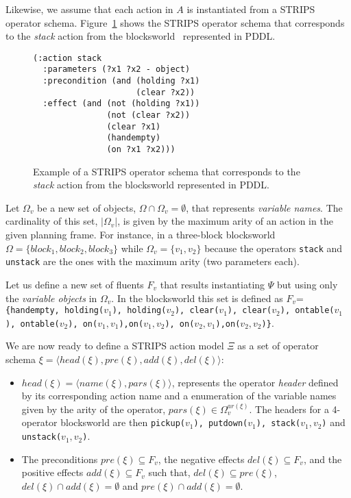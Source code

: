 \documentclass[letterpaper]{article} %
\newcommand{\tup}[1]{{\langle #1 \rangle}}
\begin{document}
Likewise, we assume that each action in $A$ is instantiated from a STRIPS operator schema. Figure~\ref{fig:stack} shows the STRIPS operator schema that corresponds to the {\em stack} action from the blocksworld~\cite{slaney2001blocks} represented in PDDL.
\begin{figure}[hbt]
\begin{footnotesize}
\begin{verbatim}
(:action stack
  :parameters (?x1 ?x2 - object)
  :precondition (and (holding ?x1) 
                     (clear ?x2))
  :effect (and (not (holding ?x1)) 
               (not (clear ?x2))
               (clear ?x1) 
               (handempty) 
               (on ?x1 ?x2)))
\end{verbatim}
\end{footnotesize}
 \caption{\small Example of a STRIPS operator schema that corresponds to the {\em stack} action from the blocksworld represented in PDDL.}
\label{fig:stack}
\end{figure}

Let $\Omega_v$ be a new set of objects, $\Omega\cap\Omega_v=\emptyset$, that represents {\em variable names}. The cardinality of this set, $|\Omega_v|$, is given by the maximum arity of an action in the given planning frame. For instance, in a three-block blocksworld $\Omega=\{block_1, block_2, block_3\}$ while $\Omega_v=\{v_1, v_2\}$ because the operators {\small\tt stack} and {\small\tt unstack} are the ones with the maximum arity (two parameters each). 

Let us define a new set of fluents $F_{v}$ that results instantiating $\Psi$ but using only the {\em variable objects} in $\Omega_v$. In the blocksworld this set is defined as $F_v$={\small\tt\{handempty, holding($v_1$), holding($v_2$), clear($v_1$), clear($v_2$), ontable($v_1$), ontable($v_2$), on($v_1,v_1$),on($v_1,v_2$), on($v_2,v_1$),on($v_2,v_2$)\}}.

We are now ready to define a STRIPS action model $\Xi$ as a set of operator schema $\xi=\tup{head(\xi),pre(\xi),add(\xi),del(\xi)}$:
\begin{itemize}
\item $head(\xi)=\tup{name(\xi),pars(\xi)}$, represents the operator {\em header} defined by its corresponding action name and a enumeration of the variable names given by the arity of the operator, $pars(\xi)\in\Omega_v^{ar(\xi)}$. The headers for a 4-operator blocksworld are then {\small\tt pickup($v_1$), putdown($v_1$), stack($v_1,v_2$)} and {\small\tt unstack($v_1,v_2$)}.
\item The preconditions $pre(\xi)\subseteq F_v$, the negative effects $del(\xi)\subseteq F_v$, and the positive effects $add(\xi)\subseteq F_v$ such that, $del(\xi)\subseteq pre(\xi)$, $del(\xi)\cap add(\xi)=\emptyset$ and $pre(\xi)\cap add(\xi)=\emptyset$.
\end{itemize}
\end{document}

